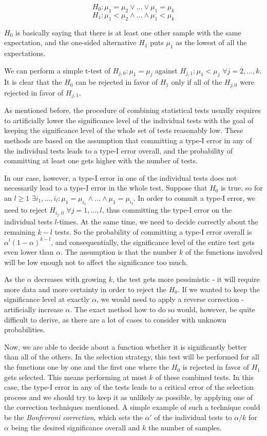 \[
H_0: \mu_1 = \mu_2 \vee ... \vee \mu_1 = \mu_k
\]
\[
H_1: \mu_1 < \mu_2 \wedge ... \wedge \mu_1 < \mu_k
\]

$H_0$ is basically saying that there is at least one other sample with the same expectation, and the one-sided alternative $H_1$ puts $\mu_1$ as the lowest of all the expectations.

We can perform a simple t-test of $H_{j,0}: \mu_1 = \mu_j$ against $H_{j,1}: \mu_1 < \mu_j$ $\forall j = 2, ..., k$. It is clear that the $H_0$ can be rejected in favor of $H_1$ only if all of the $H_{j,0}$ were rejected in favor of $H_{j,1}$. 

As mentioned before, the procedure of combining statistical tests usually requires to artificially lower the significance level of the individual tests with the goal of keeping the significance level of the whole set of tests reasonably low. These methods are based on the assumption that committing a type-I error in any of the individual tests leads to a type-I error overall, and the probability of committing at least one gets higher with the number of tests.

In our case, however, a type-I error in one of the individual tests does not necessarily lead to a type-I error in the whole test. Suppose that $H_0$ is true, so for an $l \geq 1$ $\exists i_1,...,i_l: \mu_1 = \mu_{i_1} \wedge ... \wedge \mu_1 = \mu_{i_l}$. In order to commit a type-I error, we need to reject $H_{i_j,0}$ $\forall j = 1, ..., l$, thus committing the type-I error on the individual tests $l$-times. At the same time, we need to decide correctly about the remaining $k-l$ tests. So the probability of committing a type-I error overall is $\alpha^l(1-\alpha)^{k-l}$, and consequentially, the significance level of the entire test gets even lower than $\alpha$. The assumption is that the number $k$ of the functions involved will be low enough not to affect the significance too much. 

As the $\alpha$ decreases with growing $k$, the test gets more pessimistic - it will require more data and more certainty in order to reject the $H_0$. If we wanted to keep the significance level at exactly $\alpha$, we would need to apply a reverse correction - artificially increase $\alpha$. The exact method how to do so would, however, be quite difficult to derive, as there are a lot of cases to consider with unknown probabilities. 

Now, we are able to decide about a function whether it is significantly better than all of the others. In the selection strategy, this test will be performed for all the functions one by one and the first one where the $H_0$ is rejected in favor of $H_1$ gets selected. This means performing at most $k$ of these combined tests. In this case, the type-I error in any of the tests leads to a critical error of the selection process and we should try to keep it as unlikely as possible, by applying one of the correction techniques mentioned. A simple example of such a technique could be the \textit{Bonferroni correction}, which sets the $\alpha'$ of the individual tests to $\alpha / k$ for $\alpha$ being the desired significance overall and $k$ the number of samples.


